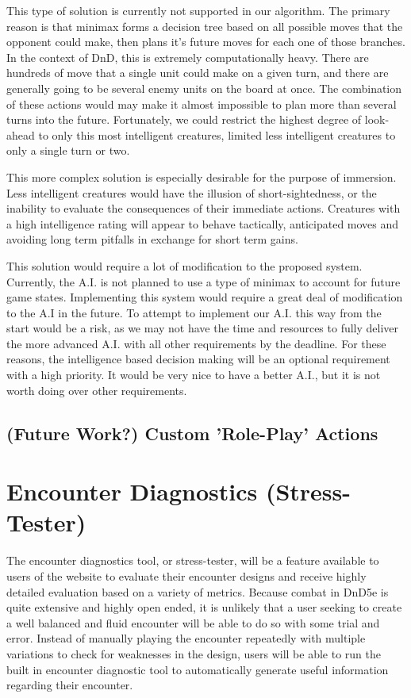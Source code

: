 \documentclass[12pt,a4paper]{report}
\begin{document}
		This type of solution is currently not supported in our algorithm. The primary reason is that minimax forms a decision tree based on all possible moves that the opponent could make, then plans it's future moves for each one of those branches. In the context of DnD, this is extremely computationally heavy. There are hundreds of move that a single unit could make on a given turn, and there are generally going to be several enemy units on the board at once. The combination of these actions would may make it almost impossible to plan more than several turns into the future. Fortunately, we could restrict the highest degree of look-ahead to only this most intelligent creatures, limited less intelligent creatures to only a single turn or two. 
		
		This more complex solution is especially desirable for the purpose of immersion. Less intelligent creatures would have the illusion of short-sightedness, or the inability to evaluate the consequences of their immediate actions. Creatures with a high intelligence rating will appear to behave tactically, anticipated moves and avoiding long term pitfalls in exchange for short term gains. 
		
		This solution would require a lot of modification to the proposed system. Currently, the A.I. is not planned to use a type of minimax to account for future game states. Implementing this system would require a great deal of modification to the A.I in the future. To attempt to implement our A.I. this way from the start would be a risk, as we may not have the time and resources to fully deliver the more advanced A.I. with all other requirements by the deadline. For these reasons, the intelligence based decision making will be an optional requirement with a high priority. It would be very nice to have a better A.I., but it is not worth doing over other requirements. 
		
		\subsection{(Future Work?) Custom 'Role-Play' Actions}
	
	\section{Encounter Diagnostics (Stress-Tester)}
	The encounter diagnostics tool, or stress-tester, will be a feature available to users of the website to evaluate their encounter designs and receive highly detailed evaluation based on a variety of metrics. Because combat in DnD5e is quite extensive and highly open ended, it is unlikely that a user seeking to create a well balanced and fluid encounter will be able to do so with some trial and error. Instead of manually playing the encounter repeatedly with multiple variations to check for weaknesses in the design, users will be able to run the built in encounter diagnostic tool to automatically generate useful information regarding their encounter. 
	
\end{document}
